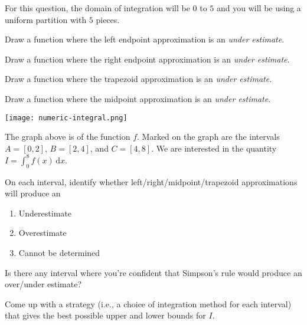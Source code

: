 \documentclass{workbook}
\begin{document}
\begin{slide}
	\question
	For this question, the domain of integration will be $0$ to $5$ and you will
	be using a uniform partition with $5$ pieces.

	\begin{parts}
		\item Draw a function where the left endpoint approximation is an \emph{under estimate}.
		
		\item Draw a function where the right endpoint approximation is an \emph{under estimate}.
		
		\item Draw a function where the trapezoid approximation is an \emph{under estimate}.
		
		\item Draw a function where the midpoint approximation is an \emph{under estimate}.

	\end{parts}
\end{slide}


\begin{slide}
	\question

	\texttt{[image: numeric-integral.png]}

	The graph above is of the function $f$. Marked on the graph are the intervals
	$A=[0,2]$, $B=[2,4]$, and $C=[4,8]$. We are interested in the quantity $\displaystyle I=\int_0^8 f(x)\,\mathrm d x$.
	\begin{parts}
		\item On each interval, identify whether left/right/midpoint/trapezoid approximations will produce an
		\begin{enumerate}
			\item Underestimate 
			\item Overestimate 
			\item Cannot be determined
		\end{enumerate}

		\item Is there any interval where you're confident that Simpson's rule would produce 
		an over/under estimate?

		\item Come up with a strategy (i.e., a choice of integration method for each interval)
		that gives the best possible upper and lower bounds for $I$.

	\end{parts}
\end{slide}
\end{document}
